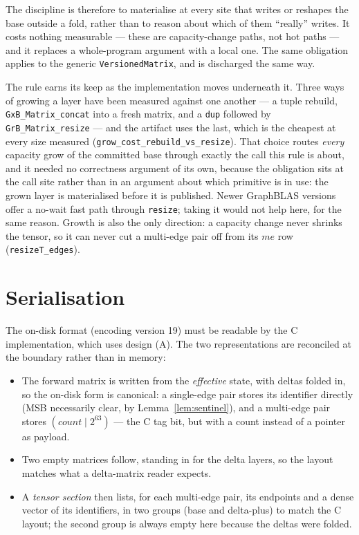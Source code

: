 \documentclass[11pt,a4paper]{article}
\theoremstyle{plain}
\theoremstyle{definition}
\theoremstyle{remark}
\begin{document}
The discipline is therefore to materialise at every site that writes or reshapes
the base outside a fold, rather than to reason about which of them ``really''
writes. It costs nothing measurable --- these are capacity-change paths, not hot
paths --- and it replaces a whole-program argument with a local one. The same
obligation applies to the generic \texttt{VersionedMatrix}, and is discharged
the same way.

The rule earns its keep as the implementation moves underneath it. Three ways
of growing a layer have been measured against one another --- a tuple rebuild,
\texttt{GxB\_Matrix\_concat} into a fresh matrix, and a \texttt{dup} followed by
\texttt{GrB\_Matrix\_resize} --- and the artifact uses the last, which is the
cheapest at every size measured
(\texttt{grow\_cost\_rebuild\_vs\_resize}). That choice routes \emph{every}
capacity grow of the committed base through exactly the call this rule is
about, and it needed no correctness argument of its own, because the
obligation sits at the call site rather than in an argument about which
primitive is in use: the grown layer is materialised before it is published.
Newer GraphBLAS versions offer a no-wait fast path through \texttt{resize};
taking it would not help here, for the same reason. Growth is also the only
direction: a capacity change never shrinks the tensor, so it can never cut a
multi-edge pair off from its $me$ row (\texttt{resizeT\_edges}).

\section{Serialisation}
\label{sec:codec}
\label{sec:serialisation}

The on-disk format (encoding version 19) must be readable by the C
implementation, which uses design (A). The two representations are reconciled
at the boundary rather than in memory:

\begin{itemize}
  \item The forward matrix is written from the \emph{effective} state, with
        deltas folded in, so the on-disk form is canonical: a single-edge pair
        stores its identifier directly (MSB necessarily clear, by
        Lemma~\ref{lem:sentinel}), and a multi-edge pair stores
        $(\mathit{count} \mathbin{|} 2^{63})$ --- the C tag bit, but with a
        count instead of a pointer as payload.
  \item Two empty matrices follow, standing in for the delta layers, so the
        layout matches what a delta-matrix reader expects.
  \item A \emph{tensor section} then lists, for each multi-edge pair, its
        endpoints and a dense vector of its identifiers, in two groups (base
        and delta-plus) to match the C layout; the second group is always
        empty here because the deltas were folded.
\end{itemize}
\end{document}
